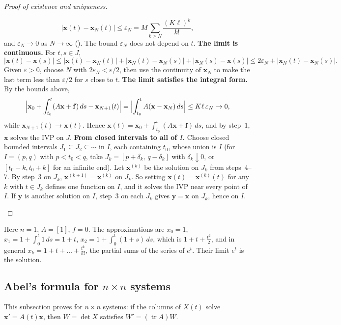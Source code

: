 \documentclass[10pt]{scrartcl}
\newcommand{\vv}[1]{\mathbf{#1}}
\DeclareMathOperator{\tr}{tr}
\begin{document}
\begin{proof}[Proof of existence and uniqueness]
\begin{steps}
    \[
      |\vv x(t)-\vv x_N(t)|\le\varepsilon_N=M\sum_{k\ge N}\frac{(K\ell)^k}{k!},
    \]
    and $\varepsilon_N\to 0$ as $N\to\infty$ (). The bound $\varepsilon_N$ does not depend on $t$.
    \ii \textbf{The limit is continuous.} For $t,s\in J$,
    \[
      |\vv x(t)-\vv x(s)|\le|\vv x(t)-\vv x_N(t)|+|\vv x_N(t)-\vv x_N(s)|+|\vv x_N(s)-\vv x(s)|\le 2\varepsilon_N+|\vv x_N(t)-\vv x_N(s)|.
    \]
    Given $\varepsilon>0$, choose $N$ with $2\varepsilon_N<\varepsilon/2$, then use the continuity of $\vv x_N$ to make the last term less than $\varepsilon/2$ for $s$ close to $t$.
    \ii \textbf{The limit satisfies the integral form.} By the bounds above,
    \[
      \Bigl|\vv x_0+\int_{t_0}^t(A\vv x+\vv f)\,ds-\vv x_{N+1}(t)\Bigr|=\Bigl|\int_{t_0}^tA(\vv x-\vv x_N)\,ds\Bigr|\le K\ell\,\varepsilon_N\to 0,
    \]
    while $\vv x_{N+1}(t)\to\vv x(t)$. Hence $\vv x(t)=\vv x_0+\int_{t_0}^t(A\vv x+\vv f)\,ds$, and by step~1, $\vv x$ solves the IVP on $J$.
    \ii \textbf{From closed intervals to all of $I$.} Choose closed bounded intervals $J_1\subseteq J_2\subseteq\cdots$ in $I$, each containing $t_0$, whose union is $I$ (for $I=(p,q)$ with $p<t_0<q$, take $J_k=[p+\delta_k,\,q-\delta_k]$ with $\delta_k\downarrow 0$, or $[t_0-k,t_0+k]$ for an infinite end). Let $\vv x^{(k)}$ be the solution on $J_k$ from steps~4--7. By step~3 on $J_k$, $\vv x^{(k+1)}=\vv x^{(k)}$ on $J_k$. So setting $\vv x(t)=\vv x^{(k)}(t)$ for any $k$ with $t\in J_k$ defines one function on $I$, and it solves the IVP near every point of $I$. If $\vv y$ is another solution on $I$, step~3 on each $J_k$ gives $\vv y=\vv x$ on $J_k$, hence on $I$. \qedhere
  \end{steps}
\end{proof}

\begin{example*}[Successive approximations for $x'=x$, $x(0)=1$]
  Here $n=1$, $A=[1]$, $f=0$. The approximations are $x_0=1$, $x_1=1+\int_0^t1\,ds=1+t$, $x_2=1+\int_0^t(1+s)\,ds$, which is $1+t+\frac{t^2}{2}$, and in general $x_k=1+t+\dots+\frac{t^k}{k!}$, the partial sums of the series of $e^t$. Their limit $e^t$ is the solution.
\end{example*}

\subsection{Abel's formula for $n\times n$ systems}
This subsection proves  for $n\times n$ systems: if the columns of $X(t)$ solve $\vv x'=A(t)\vv x$, then $W=\det X$ satisfies $W'=(\tr A)W$.
\end{document}
